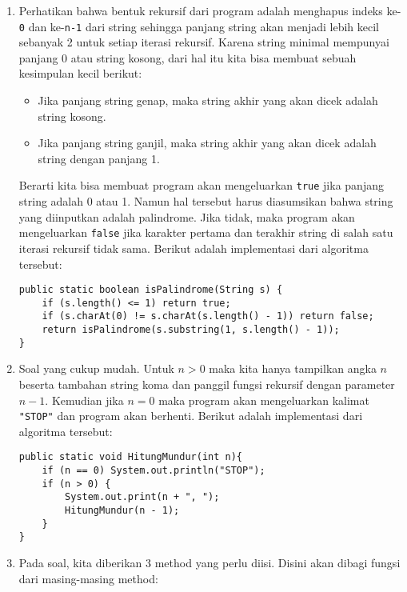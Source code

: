 \documentclass[10pt,openany,a4paper]{article}
\begin{document}
\begin{enumerate}
    \item Perhatikan bahwa bentuk rekursif dari program adalah menghapus indeks ke-\texttt{0} dan ke-\texttt{n-1} dari string sehingga panjang string akan menjadi lebih kecil sebanyak 2 untuk setiap iterasi rekursif. Karena string minimal mempunyai panjang 0 atau string kosong, dari hal itu kita bisa membuat sebuah kesimpulan kecil berikut:
    \begin{itemize}
        \item Jika panjang string genap, maka string akhir yang akan dicek adalah string kosong.
        \item Jika panjang string ganjil, maka string akhir yang akan dicek adalah string dengan panjang 1.
    \end{itemize}
    Berarti kita bisa membuat program akan mengeluarkan \texttt{true} jika panjang string adalah 0 atau 1. Namun hal tersebut harus diasumsikan bahwa string yang diinputkan adalah palindrome. Jika tidak, maka program akan mengeluarkan \texttt{false} jika karakter pertama dan terakhir string di salah satu iterasi rekursif tidak sama. Berikut adalah implementasi dari algoritma tersebut:
    \begin{verbatim}
public static boolean isPalindrome(String s) {
    if (s.length() <= 1) return true;
    if (s.charAt(0) != s.charAt(s.length() - 1)) return false;
    return isPalindrome(s.substring(1, s.length() - 1));
}
    \end{verbatim}
    \item Soal yang cukup mudah. Untuk $n>0$ maka kita hanya tampilkan angka $n$ beserta tambahan string koma dan panggil fungsi rekursif dengan parameter $n-1$. Kemudian jika $n=0$ maka program akan mengeluarkan kalimat \texttt{"STOP"} dan program akan berhenti. Berikut adalah implementasi dari algoritma tersebut:
    \begin{verbatim}
public static void HitungMundur(int n){
    if (n == 0) System.out.println("STOP");
    if (n > 0) {
        System.out.print(n + ", ");
        HitungMundur(n - 1);
    }	    
}
    \end{verbatim}
    \item Pada soal, kita diberikan 3 method yang perlu diisi. Disini akan dibagi fungsi dari masing-masing method:

\end{enumerate}
\end{document}
